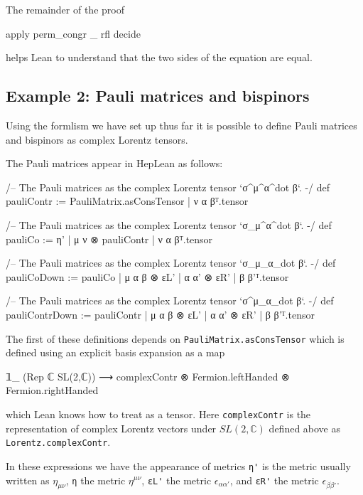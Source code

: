\documentclass[a4paper, 11pt]{article}
\DeclareRobustCommand{\myinline}{\lstinline}
\begin{document}
The remainder of the proof
\begin{code}
  apply perm_congr _ rfl
  decide
\end{code}
helps Lean to understand that the two sides of the equation are equal.
\subsection{Example 2: Pauli matrices and bispinors} \label{sec:examplePauliBispinor}
Using the formlism we have set up thus far it is possible to define Pauli matrices and bispinors 
as complex Lorentz tensors.
 
The Pauli matrices appear in HepLean as follows:
\begin{code}
/-- The Pauli matrices as the complex Lorentz tensor `σ^μ^α^{dot β}`. -/
def pauliContr := {PauliMatrix.asConsTensor | ν α β}ᵀ.tensor

/-- The Pauli matrices as the complex Lorentz tensor `σ_μ^α^{dot β}`. -/
def pauliCo := {η' | μ ν ⊗ pauliContr | ν α β}ᵀ.tensor

/-- The Pauli matrices as the complex Lorentz tensor `σ_μ_α_{dot β}`. -/
def pauliCoDown := {pauliCo | μ α β ⊗ εL' | α α' ⊗ εR' | β β'}ᵀ.tensor

/-- The Pauli matrices as the complex Lorentz tensor `σ^μ_α_{dot β}`. -/
def pauliContrDown := {pauliContr | μ α β ⊗ εL' | α α' ⊗ εR' | β β'}ᵀ.tensor
\end{code}
The first of these definitions depends on \myinline|PauliMatrix.asConsTensor| which is defined 
using an explicit basis expansion as a map 
\begin{code}
  𝟙_ (Rep ℂ SL(2,ℂ)) ⟶ complexContr ⊗ Fermion.leftHanded ⊗ Fermion.rightHanded
\end{code}
which Lean 
knows how to treat as a tensor. Here \myinline|complexContr| is the representation of complex Lorentz vectors 
under $SL(2, \mathbb{C})$ defined above as \myinline|Lorentz.complexContr|.

In these expressions we have the appearance of metrics \myinline|η'| is the metric usually written as 
$\eta_{\mu \nu}$, \myinline|η| the metric $\eta^{\mu \nu}$, \myinline|εL'| the  metric 
$\epsilon_{\alpha \alpha'}$, and \myinline|εR'| the metric $\epsilon_{\dot \beta \dot \beta'}$.
\end{document}

